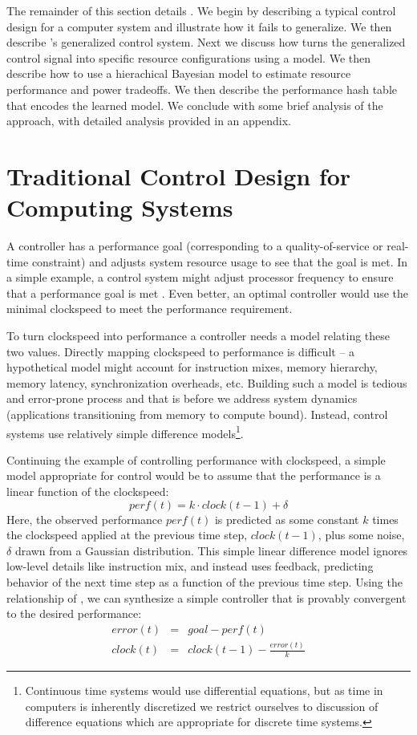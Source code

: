The remainder of this section details \SYSTEM{}.  We begin by
describing a typical control design for a computer system and
illustrate how it fails to generalize.  We then describe \SYSTEM{}'s
generalized control system.  Next we discuss how \SYSTEM{} turns the
generalized control signal into specific resource configurations using
a model.  We then describe how to use a hierachical Bayesian model to
estimate resource performance and power tradeoffs.  We then describe
the performance hash table that encodes the learned model. We conclude
with some brief analysis of the approach, with detailed analysis
provided in an appendix.


\section{Traditional Control Design for Computing Systems}
A controller has a performance goal (corresponding to a
quality-of-service or real-time constraint) and adjusts system resource
usage to see that the goal is met.  In a simple example, a control
system might adjust processor frequency to ensure that a performance
goal is met \cite{lefurgy}.  Even better, an optimal controller would
use the minimal clockspeed to meet the performance requirement.

To turn clockspeed into performance a controller needs a model
relating these two values.  Directly mapping clockspeed to performance
is difficult -- a hypothetical model might account for instruction
mixes, memory hierarchy, memory latency, synchronization overheads,
etc.  Building such a model is tedious and error-prone process and
that is before we address system dynamics (\eg applications
transitioning from memory to compute bound).  Instead, control systems
use relatively simple difference models\footnote{Continuous time
  systems would use differential equations, but as time in computers
  is inherently discretized we restrict ourselves to discussion of
  difference equations which are appropriate for discrete time
  systems.}. 

Continuing the example of controlling performance with clockspeed, a
simple model appropriate for control would be to assume that the
performance is a linear function of the clockspeed:
\begin{equation}
  perf(t) = k \cdot clock(t-1) + \delta \label{eqn:clock}
\end{equation}
Here, the observed performance $perf(t)$ is predicted as some constant
$k$ times the clockspeed applied at the previous time step,
$clock(t-1)$, plus some noise, $\delta$ drawn from a Gaussian
distribution.  This simple linear difference model ignores low-level
details like instruction mix, and instead uses feedback, predicting
behavior of the next time step as a function of the previous time
step.  Using the relationship of , we can synthesize a
simple controller that is provably convergent to the desired
performance:
\begin{eqnarray}
  error(t) &=& goal - perf(t) \label{eqn:clock-error} \\
  clock(t) &=& clock(t-1) - \frac{error(t)}{k}
  \label{eqn:clock-control}
\end{eqnarray}


